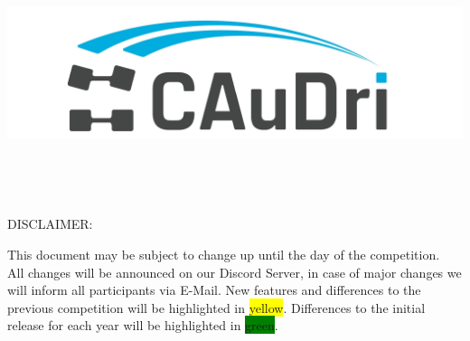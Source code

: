 \documentclass{caudri_report}
\begin{document}
\begin{titlepage}
	\makeatletter
	\begin{center}
		\vspace*{3cm}

		\includegraphics[width=\textwidth]{caudri_logo.jpg}\\
		\vspace{1cm}

		\Huge\bfseries\@title\\
		\vspace{\baselineskip}

		\Large\@date\\
		\vfill

		\large DISCLAIMER:\\

		{\raggedright This document may be subject to change up until the day of the competition.\\
		All changes will be announced on our Discord Server, in case of major changes we will inform all participants via E-Mail.
		New features and differences to the previous competition will be highlighted in \colorbox{yellow}{yellow}.
		Differences to the initial release for each year will be highlighted in \colorbox{green}{green}.\\}

	\end{center}
	\makeatother
\end{titlepage}

\tableofcontents









\end{document}

